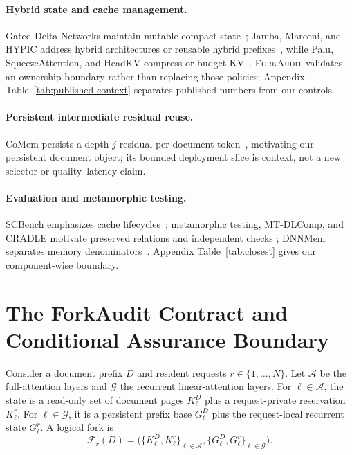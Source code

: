 \documentclass{article}
\newcommand{\method}{\textsc{ForkAudit}}
\begin{document}
\paragraph{Hybrid state and cache management.}
Gated Delta Networks maintain mutable compact state~\citep{yang2025gateddeltanet};
Jamba, Marconi, and HYPIC address hybrid architectures or reusable hybrid
prefixes~\citep{lieber2025jamba,pan2025marconi,liu2026hypic}, while Palu,
SqueezeAttention, and HeadKV compress or budget KV~\citep{chang2025palu,
wang2025squeezeattention,fu2025headkv}.  \method{} validates an ownership
boundary rather than replacing those policies; Appendix
Table~\ref{tab:published-context} separates published numbers from our controls.

\paragraph{Persistent intermediate residual reuse.}
CoMem persists a depth-$j$ residual per document token~\citep{liu2026comem,
liu2026understanding}, motivating our persistent document object; its bounded
deployment slice is context, not a new selector or quality--latency claim.

\paragraph{Evaluation and metamorphic testing.}
SCBench emphasizes cache lifecycles~\citep{li2025scbench}; metamorphic testing,
MT-DLComp, and CRADLE motivate preserved relations and independent checks
\citep{chen2018metamorphic,xiao2022metamorphic,pham2019cradle}; DNNMem separates
memory denominators~\citep{gao2020dnnmem}.  Appendix Table~\ref{tab:closest}
gives our component-wise boundary.

\section{The ForkAudit Contract and Conditional Assurance Boundary}
\label{sec:contract}

Consider a document prefix $D$ and resident requests
$r\in\{1,\ldots,N\}$.  Let $\mathcal{A}$ be the full-attention layers and
$\mathcal{G}$ the recurrent linear-attention layers.  For
$\ell\in\mathcal{A}$, the state is a read-only set of document pages
$K^D_\ell$ plus a request-private reservation $K^r_\ell$.  For
$\ell\in\mathcal{G}$, it is a persistent prefix base $G^D_\ell$ plus the
request-local recurrent state $G^r_\ell$.  A logical fork is
\begin{equation}
  \mathcal{F}_r(D) =
  \bigl(\{K^D_\ell,K^r_\ell\}_{\ell\in\mathcal{A}},
        \{G^D_\ell,G^r_\ell\}_{\ell\in\mathcal{G}}\bigr).
\end{equation}
\end{document}
